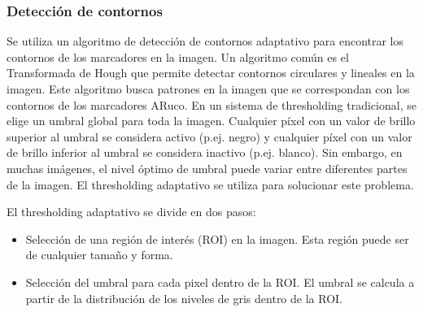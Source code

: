 \subsubsection*{Detección de contornos}
Se utiliza un algoritmo de detección de contornos adaptativo para encontrar los contornos de los marcadores en la imagen. Un algoritmo común es el Transformada de Hough que permite detectar contornos circulares y lineales en la imagen. Este algoritmo busca patrones en la imagen que se correspondan con los contornos de los marcadores ARuco.
En un sistema de thresholding tradicional, se elige un umbral global para toda la imagen. Cualquier píxel con un valor de brillo superior al umbral se considera activo (p.ej. negro) y cualquier píxel con un valor de brillo inferior al umbral se considera inactivo (p.ej. blanco). Sin embargo, en muchas imágenes, el nivel óptimo de umbral puede variar entre diferentes partes de la imagen. El thresholding adaptativo se utiliza para solucionar este problema.

El thresholding adaptativo se divide en dos pasos:
\begin{itemize}
\item Selección de una región de interés (ROI) en la imagen. Esta región puede ser de cualquier tamaño y forma.
\item Selección del umbral para cada pixel dentro de la ROI. El umbral se calcula a partir de la distribución de los niveles de gris dentro de la ROI.
\end{itemize}

